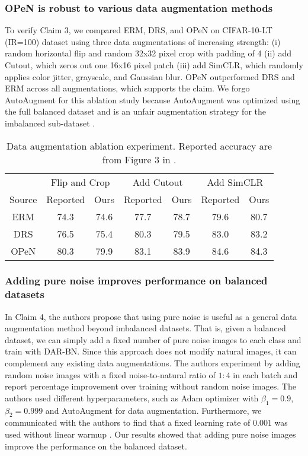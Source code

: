 \subsubsection{OPeN is robust to various data augmentation methods} To verify Claim 3, we compared ERM, DRS, and OPeN on CIFAR-10-LT (IR=100) dataset using three data augmentations of increasing strength: (i) random horizontal flip and random 32x32 pixel crop with padding of 4 (ii) add Cutout, \citep{CutOut} which zeros out one 16x16 pixel patch (iii) add SimCLR, \citep{SimCLR} which randomly applies color jitter, grayscale, and Gaussian blur. OPeN outperformed DRS and ERM across all augmentations, which supports the claim. We forgo AutoAugment \citep{AutoAugment} for this ablation study because AutoAugment was optimized using the full balanced dataset and is an unfair augmentation strategy for the imbalanced sub-dataset \citep{PureNoise, GLICO}.

\begin{table}[!ht]
    \centering
    \begin{tabular}{c|cc|cc|cc}
         & \multicolumn{2}{c|}{Flip and Crop} & \multicolumn{2}{c|}{Add Cutout} & \multicolumn{2}{c}{Add SimCLR} \\
        Source & Reported & Ours & Reported & Ours & Reported & Ours \\
        \hline
        ERM & 74.3 & 74.6 & 77.7 & 78.7 & 79.6 & 80.7 \\
        DRS \citep{LDAM-DRW} & 76.5 & 75.4 & 80.3 & 79.5 & 83.0 & 83.2 \\
        OPeN \citep{PureNoise} & 80.3 & 79.9 & 83.1 & 83.9 & 84.6 & 84.3 \\
    \end{tabular}
    \caption{Data augmentation ablation experiment. Reported accuracy are from Figure 3 in \citet{PureNoise}.}
    \label{tab:dataaug_ablation}
\end{table}

\subsubsection{Adding pure noise improves performance on balanced datasets}

In Claim 4, the authors propose that using pure noise is useful as a general data augmentation method beyond imbalanced datasets. That is, given a balanced dataset, we can simply add a fixed number of pure noise images to each class and train with DAR-BN. Since this approach does not modify natural images, it can complement any existing data augmentations. The authors experiment by adding random noise images with a fixed noise-to-natural ratio of $1:4$ in each batch and report percentage improvement over training without random noise images. The authors used different hyperparameters, such as Adam optimizer with $\beta_1 = 0.9$, $\beta_2 = 0.999$ and AutoAugment \citep{AutoAugment} for data augmentation. Furthermore, we communicated with the authors to find that a fixed learning rate of $0.001$ was used without linear warmup \citep{ImageNet1h}. Our results showed that adding pure noise images improve the performance on the balanced dataset.

